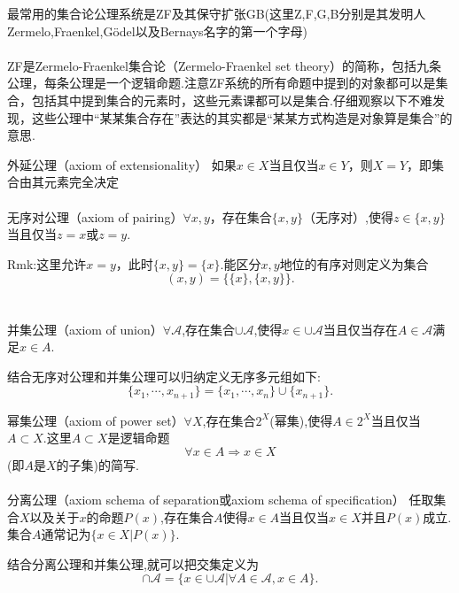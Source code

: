 \begin{frame}
最常用的集合论公理系统是ZF及其保守扩张GB(这里Z,F,G,B分别是其发明人Zermelo,Fraenkel,Gödel以及Bernays名字的第一个字母)
\\ \hspace*{\fill} \\%
ZF是\alert{Zermelo-Fraenkel集合论}（Zermelo-Fraenkel set theory）的简称，包括九条公理，每条公理是一个逻辑命题.注意ZF系统的所有命题中提到的对象都可以是集合，包括其中提到集合的元素时，这些元素课都可以是集合.仔细观察以下不难发现，这些公理中“某某集合存在”表达的其实都是“某某方式构造是对象算是集合”的意思.
\end{frame}

\begin{frame}
\alert{外延公理}（axiom of extensionality） 如果$x\in X$当且仅当$x\in Y$，则$X=Y$，即集合由其元素完全决定
\\ \hspace*{\fill} \\%
\alert{无序对公理}（axiom of pairing）$\forall x,y$，存在集合$\{x,y\}$（无序对）,使得$z\in \{x,y\}$当且仅当$z=x$或$z=y$.

Rmk:这里允许$x=y$，此时$\{x,y\}=\{x\}$.能区分$x,y$地位的有序对则定义为集合
\begin{equation}
(x,y) = \{\{x\},\{x,y\}\}.
\end{equation}
\\ \hspace*{\fill} \\%
\alert{并集公理}（axiom of union）$\forall \mathcal{A}$,存在集合$\cup\mathcal{A}$,使得$x\in\cup\mathcal{A}$当且仅当存在$A\in\mathcal{A}$满足$x\in A$.

结合无序对公理和并集公理可以归纳定义无序多元组如下:
\begin{equation}
\{x_1,\cdots,x_{n+1} \} = \{x_1,\cdots,x_{n} \} \cup \{x_{n+1}\}.
\end{equation}

\end{frame}

\begin{frame}
\alert{幂集公理}（axiom of power set）$\forall X$,存在集合$2^{X}$(幂集),使得$A\in 2^{X}$当且仅当 $A\subset X$.这里$A\subset X$是逻辑命题
\begin{equation}
\forall x\in A\Rightarrow x\in X
\end{equation}
(即$A$是$X$的子集)的简写.
\\ \hspace*{\fill} \\%
\alert{分离公理}（axiom schema of separation或axiom schema of specification） 任取集合$X$以及关于$x$的命题$P(x)$,存在集合$A$使得$x\in A$当且仅当$x\in X$并且$P(x)$成立.集合$A$通常记为$\{x\in X|P(x)\}$.

结合分离公理和并集公理,就可以把交集定义为
\begin{equation}
\cap \mathcal{A} = \{x\in\cup\mathcal{A}|\forall A\in\mathcal{A},x\in A \}.
\end{equation}
\end{frame}

